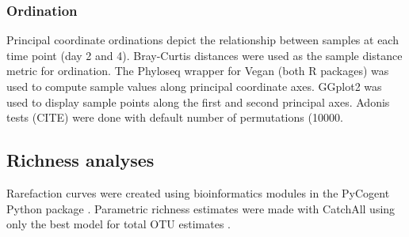 \subsubsection{Ordination}
Principal coordinate ordinations depict the relationship between
samples at each time point (day 2 and 4). Bray-Curtis distances were
used as the sample distance metric for ordination. The Phyloseq
\citep{24699258} wrapper for Vegan \citep{vegan} (both R packages) was
used to compute sample values along principal coordinate axes. GGplot2
\citep{ggplot2} was used to display sample points along the first and
second principal axes. Adonis tests (CITE) were done with default
number of permutations (10000.

\subsection{Richness analyses} Rarefaction curves were created using
bioinformatics modules in the PyCogent Python package \citep{Knight_2007}.
Parametric richness estimates were made with CatchAll using only the best model
for total OTU estimates \citep{BUNGE_2010}.
